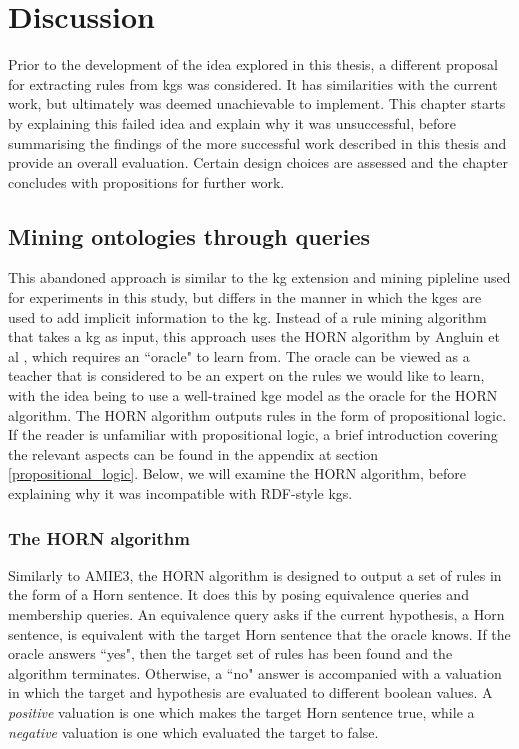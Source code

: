 \chapter{Discussion}
Prior to the development of the idea explored in this thesis, a different proposal for extracting rules from \glspl{kg} was considered. It has similarities with the current work, but ultimately was deemed unachievable to implement. This chapter starts by explaining this failed idea and explain why it was unsuccessful, before summarising the findings of the more successful work described in this thesis and provide an overall evaluation. Certain design choices are assessed and the chapter concludes with propositions for further work.

\section{Mining ontologies through queries}
This abandoned approach is similar to the \gls{kg} extension and mining pipleline used for experiments in this study, but differs in the manner in which the \glspl{kge} are used to add implicit information to the \gls{kg}. Instead of a rule mining algorithm that takes a \gls{kg} as input, this approach uses the HORN algorithm by Angluin et al \cite{DBLP:journals/ml/AngluinFP92}, which requires an ``oracle" to learn from. The oracle can be viewed as a teacher that is considered to be an expert on the rules we would like to learn, with the idea being to use a well-trained \gls{kge} model as the oracle for the HORN algorithm. The HORN algorithm outputs rules in the form of propositional logic. If the reader is unfamiliar with propositional logic, a brief introduction covering the relevant aspects can be found in the appendix at section \ref{propositional_logic}. Below, we will examine the HORN algorithm, before explaining why it was incompatible with RDF-style \glspl{kg}.

\subsection{The HORN algorithm}
Similarly to AMIE3, the HORN algorithm is designed to output a set of rules in the form of a Horn sentence. It does this by posing equivalence queries and membership queries. An equivalence query asks if the current hypothesis, a Horn sentence, is equivalent with the target Horn sentence that the oracle knows. If the oracle answers ``yes", then the target set of rules has been found and the algorithm terminates. Otherwise, a ``no" answer is accompanied with a valuation in which the target and hypothesis are evaluated to different boolean values. A \textit{positive} valuation is one which makes the target Horn sentence true, while a \textit{negative} valuation is one which evaluated the target to false. %

